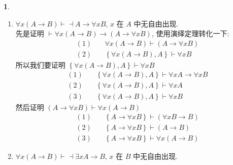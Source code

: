 \documentclass[a4paper, 12pt]{ctexbook} %
\theoremstyle{plain}
\theoremstyle{definition}
\newtheorem{problem}{}
\theoremstyle{remark}
\begin{document}
\begin{problem}
\begin{enumerate}
    \item $\forall  x \left(A \to B \right) \vdash  \dashv A \to \forall  x B $, $x$ 在 $A$ 中无自由出现. \\
    先是证明 $\vdash  \forall x \left(A \to B \right) \to  \left(A \to \forall  x B \right) $, 使用演绎定理转化一下: 
\begin{align*}
(1)\quad &\forall  x \left(A \to B \right) \vdash \left(A \to \forall  x  B \right) \\
(2)\quad &\left\{ \forall  x \left(A \to  B\right) , A\right\} \vdash \forall  x B
\end{align*} 所以我们要证明 $\left\{ \forall  x \left(A \to  B\right) , A\right\} \vdash \forall  x B $
\begin{align*}
(1)\quad &\left\{ \forall x \left(A \to B \right), A \right\} \vdash  \forall  x A \to \forall  x B \tag{A5} \\
(2)\quad &\left\{ \forall  x  \left(A \to B \right) , A    \right\} \vdash \forall  x A \tag{全称推广} \\ 
(3)\quad &\left\{ \forall  x \left(A \to B \right) , A      \right\} \vdash  \forall  x B \tag{三段}
\end{align*}
然后证明 $\left(A \to \forall  x B \right) \vdash  \forall  x \left(A \to B \right)$
\begin{align*}
(1)\quad &\left\{ A \to \forall  x B  \right\} \vdash  \left(\forall  x B \to B   \right) \tag{去全称}\\
(2)\quad &\left\{ A \to \forall  x B \right\} \vdash  \left(A \to B \right) \tag{(1),已知,三段论} \\
(3)\quad &\left\{ A \to \forall  x B \right\} \vdash  \forall  x \left(A \to B \right) \tag{全称推广}
\end{align*}
    \item $\forall  x \left(A \to B \right) \vdash  \dashv \exists x A \to B    $, $x$ 在 $B $ 中无自由出现. 


\end{enumerate}
\end{problem}
\end{document}
